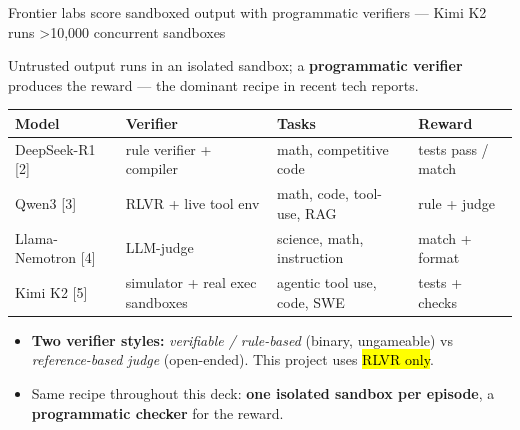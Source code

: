 \begin{frame}{Frontier labs score sandboxed output with programmatic verifiers --- Kimi K2 runs >10,000 concurrent sandboxes}
{\footnotesize Untrusted output runs in an isolated sandbox; a \textbf{programmatic verifier} produces the reward --- the dominant recipe in recent tech reports.\par}
\vspace{2mm}
\footnotesize\setlength{\tabcolsep}{5pt}
\begin{tabularx}{\textwidth}{@{}l Y Y l@{}}
\toprule
\textbf{Model} & \textbf{Verifier} & \textbf{Tasks} & \textbf{Reward}\\
\midrule
DeepSeek-R1 [2] & rule verifier + compiler & math, competitive code & tests pass / match\\
Qwen3 [3] & RLVR + live tool env & math, code, tool-use, RAG & rule + judge\\
Llama-Nemotron [4] & LLM-judge & science, math, instruction & match + format\\
Kimi K2 [5] & simulator + real exec sandboxes & agentic tool use, code, SWE & tests + checks\\
\bottomrule
\end{tabularx}
\par\vspace{3mm}
\begin{itemize}\footnotesize
\item \textbf{Two verifier styles:} \emph{verifiable / rule-based} (binary, ungameable) vs \emph{reference-based judge} (open-ended). This project uses \hl{RLVR only}.
\item Same recipe throughout this deck: \textbf{one isolated sandbox per episode}, a \textbf{programmatic checker} for the reward.
\end{itemize}
\end{frame}


